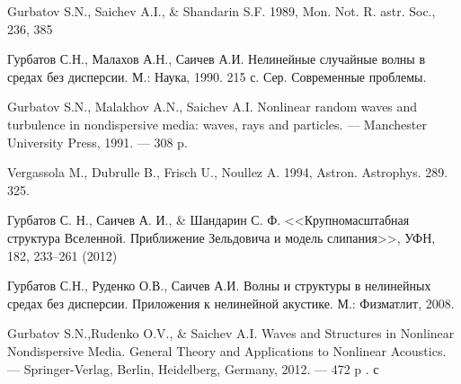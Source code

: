 \documentclass[a4paper,14pt]{extarticle}
\theoremstyle{definition}
\begin{document}
\begin{thebibliography}{99}
 Gurbatov S.N., Saichev A.I., \& Shandarin S.F. 1989, Mon. Not. R. astr. Soc., 236, 385

 Гурбатов С.Н., Малахов А.Н., Саичев А.И. Нелинейные случайные волны в средах без дисперсии. М.: Наука, 1990. 215 с. Сер. Современные проблемы.

 Gurbatov S.N., Malakhov A.N., Saichev A.I. Nonlinear random waves and turbulence in nondispersive media: waves, rays and particles. — Manchester University Press, 1991. — 308 p.

 Vergassola M., Dubrulle B., Frisch U., Noullez A. 1994, Astron. Astrophys. 289. 325.

 Гурбатов С. Н., Саичев А. И., \& Шандарин С. Ф.   <<Крупномасштабная структура Вселенной. Приближение Зельдовича и модель слипания>>,  УФН, 182,  233–261 (2012)

 Гурбатов С.Н., Руденко О.В., Саичев А.И. Волны и структуры в нелинейных средах без дисперсии. Приложения к нелинейной акустике. М.: Физматлит, 2008.

 Gurbatov S.N.,Rudenko O.V., \& Saichev A.I. Waves and Structures in Nonlinear Nondispersive Media. General Theory and Applications to Nonlinear Acoustics. — Springer-Verlag, Berlin, Heidelberg, Germany, 2012. — 472 p . с

\end{thebibliography}
\end{document}
